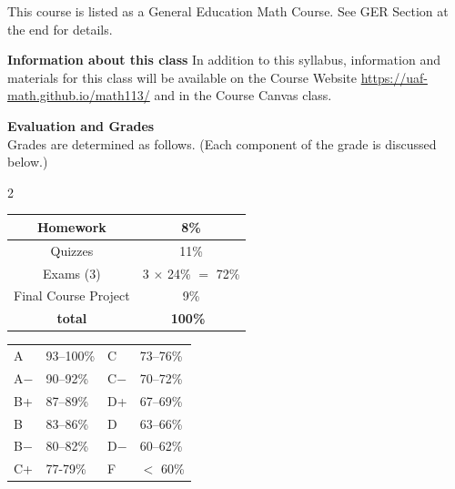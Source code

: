\documentclass[11pt]{article}
\renewcommand{\emph}[1]{\textsf{\textbf{#1}}}
\newcommand{\localhead}[1]{\par\smallskip\textbf{#1} \smallskip\nobreak\\}%
\def\heading#1{\localhead{\large\emph{#1}}}
\begin{document}
 This course is listed as a General Education Math Course. See GER Section at the end for details. 
 
\emph{\large{Information about this class}} In addition to this syllabus, information and materials for this class will be available on the Course Website \url{https://uaf-math.github.io/math113/} and in the Course Canvas class.

\heading{Evaluation and Grades}
Grades are determined as follows.  (Each component of the grade is discussed below.)
 
\begin{multicols}{2}
\begin{tabular}{|c|c|}
\hline
Homework & 8\% \\
\hline
Quizzes & 11\% \\
\hline
 Exams (3) & 3 $\times$ 24\% $=$ 72\% \\
\hline
Final Course Project & 9\% \\
\hline
{\bf total} & {\bf 100\%} \, \\
\hline
\end{tabular}
%
\hspace{1cm}
\begin{tabular}{llll}
A  & 93--100\%& C  & 73--76\%  \\
A$-$ & 90--92\% & C$-$ & 70--72\% \\
B+ & 87--89\% & D+ & 67--69\%  \\
B  & 83--86\% & D  & 63--66\%  \\
B$-$& 80--82\% & D$-$ & 60--62\%  \\
C+ & 77-79\% & F  & $<$ 60\%
\end{tabular}
\end{multicols}

%
%
%
%
\end{document}
